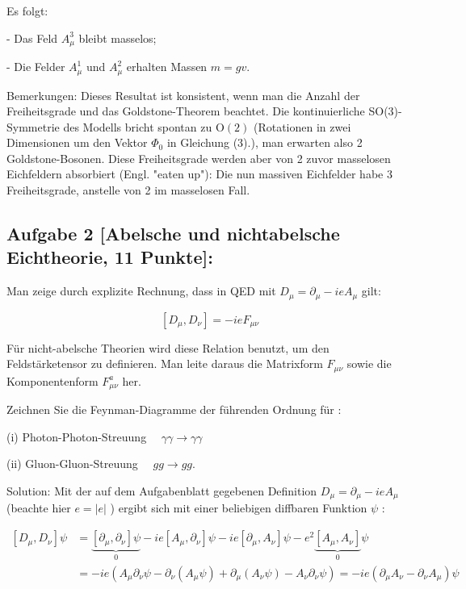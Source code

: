 \documentclass[10pt, letterpaper]{article}
\begin{document}
Es folgt:

- Das Feld $A_\mu^3$ bleibt masselos;

- Die Felder $A_\mu^1$ und $A_\mu^2$ erhalten Massen $m=g v$.

Bemerkungen: Dieses Resultat ist konsistent, wenn man die Anzahl der Freiheitsgrade und das Goldstone-Theorem beachtet. Die kontinuierliche SO(3)-Symmetrie des Modells bricht spontan zu $\mathrm{O}(2)$ (Rotationen in zwei Dimensionen um den Vektor $\Phi_0$ in Gleichung (3).), man erwarten also 2 Goldstone-Bosonen. Diese Freiheitsgrade werden aber von 2 zuvor masselosen Eichfeldern absorbiert (Engl. "eaten up"): Die nun massiven Eichfelder habe 3 Freiheitsgrade, anstelle von 2 im masselosen Fall.

\subsection{Aufgabe 2 [Abelsche und nichtabelsche Eichtheorie, 11 Punkte]:}

Man zeige durch explizite Rechnung, dass in QED mit $D_\mu=\partial_\mu-i e A_\mu$ gilt:

$$
\left[D_\mu, D_\nu\right]=-i e F_{\mu \nu}
$$


Für nicht-abelsche Theorien wird diese Relation benutzt, um den Feldstärketensor zu definieren. Man leite daraus die Matrixform $F_{\mu \nu}$ sowie die Komponentenform $F_{\mu \nu}^a$ her.

Zeichnen Sie die Feynman-Diagramme der führenden Ordnung für :

(i) Photon-Photon-Streuung $\quad \gamma \gamma \longrightarrow \gamma \gamma$

(ii) Gluon-Gluon-Streuung $\quad g g \longrightarrow g g$.



Solution: Mit der auf dem Aufgabenblatt gegebenen Definition $D_\mu=\partial_\mu-i e A_\mu$ (beachte hier $e=|e|$ ) ergibt sich mit einer beliebigen diffbaren Funktion $\psi$ :

$$
\begin{aligned}
{\left[D_\mu, D_\nu\right] \psi } & =\underbrace{\left[\partial_\mu, \partial_\nu\right] \psi}_0-i e\left[A_\mu, \partial_\nu\right] \psi-i e\left[\partial_\mu, A_\nu\right] \psi-e^2 \underbrace{\left[A_\mu, A_\nu\right]}_0 \psi \\
& =-i e\left(A_\mu \partial_\nu \psi-\partial_\nu\left(A_\mu \psi\right)+\partial_\mu\left(A_\nu \psi\right)-A_\nu \partial_\nu \psi\right)=-i e\left(\partial_\mu A_\nu-\partial_\nu A_\mu\right) \psi
\end{aligned}
$$
\end{document}
